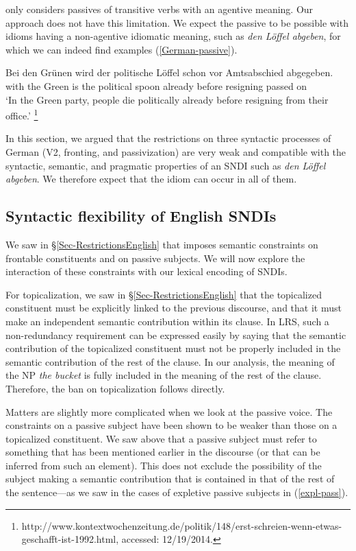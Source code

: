 \documentclass[output=paper]{langsci/langscibook}
\begin{document}
\cite{Dobrovolskij:00} only considers  passives of transitive verbs with an agentive meaning.
Our approach does not have this limitation. We expect the passive to be possible with idioms having a non-agentive idiomatic meaning, such as \textit{den L\"offel abgeben}, for which we can indeed find examples  (\ref{German-passive}).

\ea
\gll Bei den Gr\"unen wird der politische L\"offel schon vor Amtsabschied abgegeben. \\
with the Green is the political spoon already before resigning {passed on} \\
\glt `In the Green party, people die politically already before resigning from their office.'%
\footnote{http://www.kontextwochenzeitung.de/politik/148/erst-schreien-wenn-etwas-geschafft-ist-1992.html, accessed: 12/19/2014.}
\label{German-passive}
\z

In this section, we argued that the restrictions on three syntactic processes of  German (V2, fronting, and passivization) are very weak and compatible with the syntactic, semantic, and pragmatic properties of an SNDI such as \textit{den L\"offel abgeben}. We therefore expect that the idiom can occur in all of them.



\subsection{Syntactic flexibility of English SNDIs}
\label{Sec-AnalysisEnglish}

 We saw in §\ref{Sec-RestrictionsEnglish} that  imposes semantic constraints on  frontable constituents and on passive subjects. We will now explore the interaction of these constraints with our lexical encoding of SNDIs.

For  topicalization, we saw in §\ref{Sec-RestrictionsEnglish} that the topicalized constituent must be explicitly linked to the previous discourse, and that it must make an independent semantic contribution within its clause. In LRS, such a non-redundancy requirement can be expressed easily by saying that the semantic contribution of the topicalized constituent must not be properly included in the semantic contribution of the rest of the clause. In our analysis, the meaning of the NP \textit{the bucket} is fully included in the meaning of the rest of the clause. Therefore, the ban on topicalization follows directly.

Matters are slightly more complicated when we look at the  passive voice. The constraints on a passive subject have been shown to be weaker than those on a topi\-ca\-lized constituent. We saw above that a passive subject must refer to something that has been mentioned earlier in the discourse (or that can be inferred from such an element). This does not exclude the possibility of the subject making a semantic contribution that is contained in that of the rest of the sentence---as we saw in the cases of  expletive passive subjects in (\ref{expl-pass}). 
\end{document}
